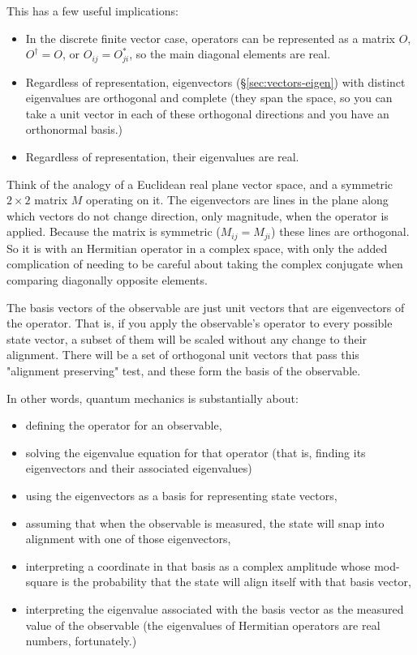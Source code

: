This has a few useful implications:

\begin{itemize}
  \item In the discrete finite vector case, operators can be represented as a matrix $O$, $O^{\dagger} = O$, or $O_{ij} = O_{ji}^*$, so the main diagonal elements are real.
  \item Regardless of representation, eigenvectors (§\ref{sec:vectors-eigen}) with distinct eigenvalues are orthogonal and complete (they span the space, so you can take a unit vector in each of these orthogonal directions and you have an orthonormal basis.)
  \item Regardless of representation, their eigenvalues are real.
\end{itemize}

Think of the analogy of a Euclidean real plane vector space, and a symmetric $2 \times 2$ matrix $M$ operating on it. The eigenvectors are lines in the plane along which vectors do not change direction, only magnitude, when the operator is applied. Because the matrix is symmetric ($M_{ij} = M_{ji}$) these lines are orthogonal. So it is with an Hermitian operator in a complex space, with only the added complication of needing to be careful about taking the complex conjugate when comparing diagonally opposite elements.

The basis vectors of the observable are just unit vectors that are eigenvectors of the operator. That is, if you apply the observable's operator to every possible state vector, a subset of them will be scaled without any change to their alignment. There will be a set of orthogonal unit vectors that pass this "alignment preserving" test, and these form the basis of the observable.

In other words, quantum mechanics is substantially about:

\begin{itemize}
  \item defining the operator for an observable,
  \item solving the eigenvalue equation for that operator (that is, finding its eigenvectors and their associated eigenvalues)
  \item using the eigenvectors as a basis for representing state vectors,
  \item assuming that when the observable is measured, the state will snap into alignment with one of those eigenvectors,
  \item interpreting a coordinate in that basis as a complex amplitude whose mod-square is the probability that the state will align itself with that basis vector,
  \item interpreting the eigenvalue associated with the basis vector as the measured value of the observable (the eigenvalues of Hermitian operators are real numbers, fortunately.)
\end{itemize}

